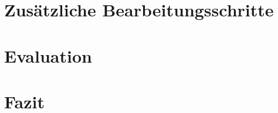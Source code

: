 \documentclass[
     11pt,         %
     a4paper,      %
     oneside,
     ]{article}
\theoremstyle{custm}
\begin{document}







\section{Zusätzliche Bearbeitungsschritte}




\newpage





\section{Evaluation}

\newpage

\section{Fazit}



\newpage

\end{document}
